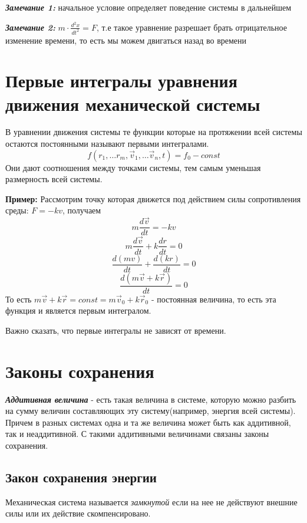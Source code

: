 \documentclass[../main.tex]{subfiles}
\begin{document}
\vspace{5px}

\textbf{\textit{Замечание 1:}} начальное условие определяет поведение системы в дальнейшем

\vspace{5px}

\textbf{\textit{Замечание 2:}} $m \cdot \frac{d^2x}{dt^2} = F$, т.е такое уравнение разрешает брать отрицательное изменение времени, то есть мы можем двигаться назад во времени
\section{Первые интегралы уравнения движения механической системы}
 В уравнении движения системы те функции которые на протяжении всей системы остаются постоянными называют первыми интегралами.
\[ f(r_1, \ldots r_m, \vec v_1, \ldots \vec v_n, t) = f_0 - const\]
Они дают соотношения между точками системы, тем самым уменьшая размерность всей системы.

\vspace{6px}

\textbf{Пример:} Рассмотрим точку которая движется под действием силы сопротивления среды: $F = -kv$, получаем
\[ m\frac{d\vec v}{dt} = -kv \]
\[m\frac{d\vec v}{dt} + k\frac{dr}{dt} = 0 \]
\[ \frac{d(mv)}{dt} + \frac{d(kr)}{dt} = 0 \]
\[ \frac{d(m\vec v + k\vec r)}{dt} = 0\]
То есть $m \vec v + k\vec r = const = m\vec v_0 + k\vec r_0$ - постоянная величина, то есть эта функция и является первым интегралом.

Важно сказать, что первые интегралы не зависят от времени.
\section{Законы сохранения}

  \textbf{\textit{Аддитивная величина}} - есть такая величина в системе, которую можно разбить на сумму величин составляющих эту систему(например, энергия всей системы). Причем в разных системах одна и та же величина может быть как аддитивной, так и неаддитивной. С такими аддитивными величинами связаны законы сохранения.


\subsection{Закон сохранения энергии}

 Механическая система называется \textit{замкнутой} если на нее не действуют внешние силы или их действие скомпенсировано.
\end{document}
